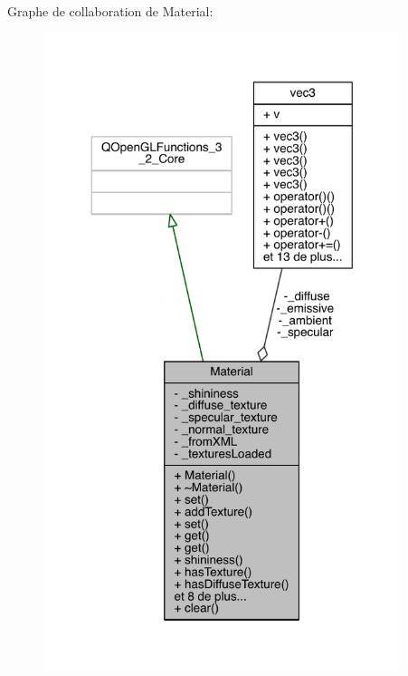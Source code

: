 Graphe de collaboration de Material\+:
\nopagebreak
\begin{figure}[H]
\begin{center}
\leavevmode
\includegraphics[width=296pt]{class_material__coll__graph}
\end{center}
\end{figure}
